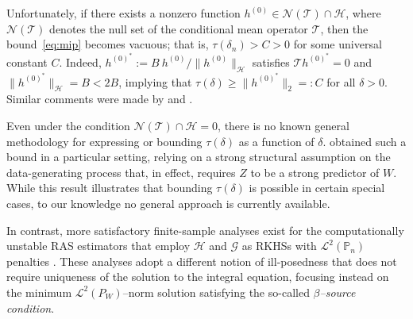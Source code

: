 \documentclass[twoside,11pt]{article}
\newcommand{\mc}{\mathcal}
\begin{document}
Unfortunately, if there exists a nonzero function $h^{(0)} \in \mathcal{N}(\mathcal{T}) \cap \mathcal{H}$, where $\mathcal{N}(\mathcal{T})$ denotes the null set of the conditional mean operator $\mathcal{T}$, then the bound~\eqref{eq:mip} becomes vacuous; that is, $\tau(\delta_n) > C > 0$ for some universal constant $C$. Indeed, 
$h^{(0)^*} := B \: {h^{(0)}}/{\|h^{(0)}\|_{\mathcal{H}}}$
satisfies $\mathcal{T} h^{(0)^*} = 0$ and $\|h^{(0)^*}\|_{\mathcal{H}} = B < 2B$, implying that $\tau(\delta) \ge \|h^{(0)^*}\|_2 =: C$ for all $\delta > 0$. Similar comments were made by \cite{kallus2021causal} and \cite{bennett2023source}. 

Even under the condition $\mathcal{N}(\mathcal{T}) \cap \mathcal{H} = {0}$, there is no known general methodology for expressing or bounding $\tau(\delta)$ as a function of $\delta$. \citet{dikkala2020minimax} obtained such a bound in a particular setting, relying on a strong structural assumption on the data-generating process that, in effect, requires $Z$ to be a strong predictor of $W$. While this result illustrates that bounding $\tau(\delta)$ is possible in certain special cases, to our knowledge no general approach is currently available.


In contrast, more satisfactory finite-sample analyses exist for the computationally unstable RAS estimators that employ $\mc{H}$ and $\mc{G}$ as RKHSs with $\mathcal{L}^2(\mathbb{P}_n)$ penalties \citep{liao2020provably,bennett2023source}. These analyses adopt a different notion of ill-posedness that does not require uniqueness of the solution to the integral equation, focusing instead on the minimum $\mathcal{L}^2(P_W)$--norm solution satisfying the so-called \textit{$\beta$--source condition}.
\end{document}
